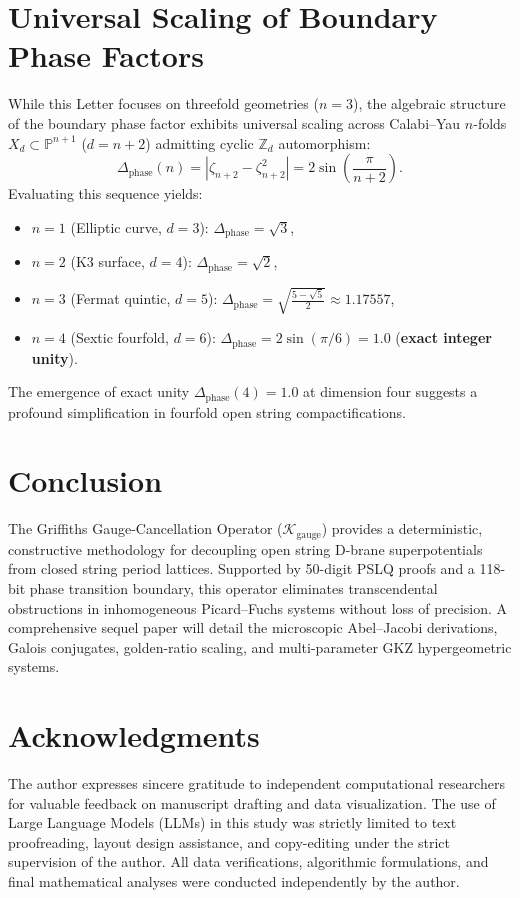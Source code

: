 \documentclass[11pt,a4paper]{article}
\theoremstyle{definition}
\begin{document}
\section{Universal Scaling of Boundary Phase Factors}

While this Letter focuses on threefold geometries ($n=3$), the algebraic structure of the boundary phase factor exhibits universal scaling across Calabi--Yau $n$-folds $X_d \subset \mathbb{P}^{n+1}$ ($d = n+2$) admitting cyclic $\mathbb{Z}_d$ automorphism:
\begin{equation}
\Delta_{\text{phase}}(n) = \left|\zeta_{n+2} - \zeta_{n+2}^2\right| = 2\sin\left(\frac{\pi}{n+2}\right).
\end{equation}
Evaluating this sequence yields:
\begin{itemize}
    \item $n=1$ (Elliptic curve, $d=3$): $\Delta_{\text{phase}} = \sqrt{3}$,
    \item $n=2$ (K3 surface, $d=4$): $\Delta_{\text{phase}} = \sqrt{2}$,
    \item $n=3$ (Fermat quintic, $d=5$): $\Delta_{\text{phase}} = \sqrt{\frac{5-\sqrt{5}}{2}} \approx 1.17557$,
    \item $n=4$ (Sextic fourfold, $d=6$): $\Delta_{\text{phase}} = 2\sin(\pi/6) = \mathbf{1.0}$ (\textbf{exact integer unity}).
\end{itemize}
The emergence of exact unity $\Delta_{\text{phase}}(4) = 1.0$ at dimension four suggests a profound simplification in fourfold open string compactifications.

\section{Conclusion}

The Griffiths Gauge-Cancellation Operator ($\mathcal{K}_{\text{gauge}}$) provides a deterministic, constructive methodology for decoupling open string D-brane superpotentials from closed string period lattices. 
Supported by 50-digit PSLQ proofs and a 118-bit phase transition boundary, this operator eliminates transcendental obstructions in inhomogeneous Picard--Fuchs systems without loss of precision. 
A comprehensive sequel paper will detail the microscopic Abel--Jacobi derivations, Galois conjugates, golden-ratio scaling, and multi-parameter GKZ hypergeometric systems.

\section*{Acknowledgments}
The author expresses sincere gratitude to independent computational researchers for valuable feedback on manuscript drafting and data visualization. The use of Large Language Models (LLMs) in this study was strictly limited to text proofreading, layout design assistance, and copy-editing under the strict supervision of the author. All data verifications, algorithmic formulations, and final mathematical analyses were conducted independently by the author.
\end{document}
